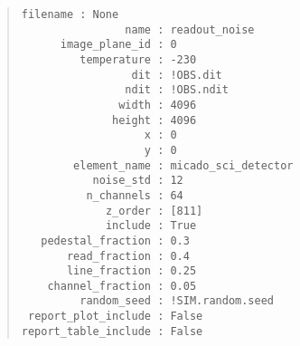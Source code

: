 \begin{quote}
\begin{alltt}
\begin{lstlisting}[frame=single]
            filename : None
                name : readout_noise
      image_plane_id : 0
         temperature : -230
                 dit : !OBS.dit
                ndit : !OBS.ndit
               width : 4096
              height : 4096
                   x : 0
                   y : 0
        element_name : micado_sci_detector
           noise_std : 12
          n_channels : 64
             z_order : [811]
             include : True
   pedestal_fraction : 0.3
       read_fraction : 0.4
       line_fraction : 0.25
    channel_fraction : 0.05
         random_seed : !SIM.random.seed
 report_plot_include : False
report_table_include : False
\end{lstlisting}
\end{alltt}
\end{quote}
